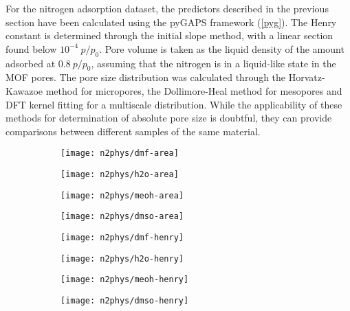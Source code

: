 For the nitrogen adsorption dataset, the predictors described in the 
previous section have been calculated using the pyGAPS framework
(\autoref{pyg}). The Henry constant is determined through the 
initial slope method, with a linear section found below 
\(10^{-4}~p/p_0\). Pore volume is taken as the liquid density
of the amount adsorbed at \(0.8~p/p_0\), assuming that the 
nitrogen is in a liquid-like state in the MOF pores. The pore
size distribution was calculated through the Horvatz-Kawazoe
method for micropores, the Dollimore-Heal method for mesopores
and DFT kernel fitting for a multiscale distribution. While 
the applicability of these methods for determination of absolute
pore size is doubtful, they can provide comparisons between 
different samples of the same material.

\begin{figure}[htb]
    \centering

    \begin{subfigure}{0.25\linewidth}
        \texttt{[image: n2phys/dmf-area]}%
        \caption{}%
        \label{def:fgr:n2phys-dmf-area}
    \end{subfigure}%
    \begin{subfigure}{0.25\linewidth}
        \texttt{[image: n2phys/h2o-area]}%
        \caption{}%
        \label{def:fgr:n2phys-h2o-area}
    \end{subfigure}%
    \begin{subfigure}{0.25\linewidth}
        \texttt{[image: n2phys/meoh-area]}%
        \caption{}%
        \label{def:fgr:n2phys-meoh-area}
    \end{subfigure}%
    \begin{subfigure}{0.25\linewidth}
        \texttt{[image: n2phys/dmso-area]}%
        \caption{}%
        \label{def:fgr:n2phys-dmso-area}
    \end{subfigure}%

    \begin{subfigure}{0.25\linewidth}
        \texttt{[image: n2phys/dmf-henry]}%
        \caption{}%
        \label{def:fgr:n2phys-dmf-henry}
    \end{subfigure}%
    \begin{subfigure}{0.25\linewidth}
        \texttt{[image: n2phys/h2o-henry]}%
        \caption{}%
        \label{def:fgr:n2phys-h2o-henry}
    \end{subfigure}%
    \begin{subfigure}{0.25\linewidth}
        \texttt{[image: n2phys/meoh-henry]}%
        \caption{}%
        \label{def:fgr:n2phys-meoh-henry}
    \end{subfigure}%
    \begin{subfigure}{0.25\linewidth}
        \texttt{[image: n2phys/dmso-henry]}%
        \caption{}%
        \label{def:fgr:n2phys-dmso-henry}
    \end{subfigure}%


\end{figure}
